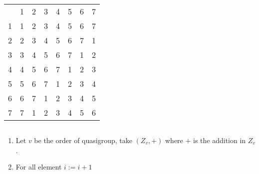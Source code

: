 \begin{frame}
\begin{columns}
		\begin{table}[]
		\begin{tabular}{llllllll}
			& 1                      & 2                      & 3                      & 4                      & 5                      & 6                      & 7                      \\ \cline{2-8} 
			\multicolumn{1}{l|}{1} & \multicolumn{1}{l|}{1} & \multicolumn{1}{l|}{2} & \multicolumn{1}{l|}{3} & \multicolumn{1}{l|}{4} & \multicolumn{1}{l|}{5} & \multicolumn{1}{l|}{6} & \multicolumn{1}{l|}{7} \\ \cline{2-8} 
			\multicolumn{1}{l|}{2} & \multicolumn{1}{l|}{2} & \multicolumn{1}{l|}{3} & \multicolumn{1}{l|}{4} & \multicolumn{1}{l|}{5} & \multicolumn{1}{l|}{6} & \multicolumn{1}{l|}{7} & \multicolumn{1}{l|}{1} \\ \cline{2-8} 
			\multicolumn{1}{l|}{3} & \multicolumn{1}{l|}{3} & \multicolumn{1}{l|}{4} & \multicolumn{1}{l|}{5} & \multicolumn{1}{l|}{6} & \multicolumn{1}{l|}{7} & \multicolumn{1}{l|}{1} & \multicolumn{1}{l|}{2} \\ \cline{2-8} 
			\multicolumn{1}{l|}{4} & \multicolumn{1}{l|}{4} & \multicolumn{1}{l|}{5} & \multicolumn{1}{l|}{6} & \multicolumn{1}{l|}{7} & \multicolumn{1}{l|}{1} & \multicolumn{1}{l|}{2} & \multicolumn{1}{l|}{3} \\ \cline{2-8} 
			\multicolumn{1}{l|}{5} & \multicolumn{1}{l|}{5} & \multicolumn{1}{l|}{6} & \multicolumn{1}{l|}{7} & \multicolumn{1}{l|}{1} & \multicolumn{1}{l|}{2} & \multicolumn{1}{l|}{3} & \multicolumn{1}{l|}{4} \\ \cline{2-8} 
			\multicolumn{1}{l|}{6} & \multicolumn{1}{l|}{6} & \multicolumn{1}{l|}{7} & \multicolumn{1}{l|}{1} & \multicolumn{1}{l|}{2} & \multicolumn{1}{l|}{3} & \multicolumn{1}{l|}{4} & \multicolumn{1}{l|}{5} \\ \cline{2-8} 
			\multicolumn{1}{l|}{7} & \multicolumn{1}{l|}{7} & \multicolumn{1}{l|}{1} & \multicolumn{1}{l|}{2} & \multicolumn{1}{l|}{3} & \multicolumn{1}{l|}{4} & \multicolumn{1}{l|}{5} & \multicolumn{1}{l|}{6} \\ \cline{2-8} 
		\end{tabular}
	\end{table}
\end{columns}

\begin{enumerate}
	\item Let $v$ be the order of quasigroup, take $(Z_v,+)$ where $+$ is the addition in $Z_v$.
	\item For all element $i := i +1$
\end{enumerate}
\end{frame}



